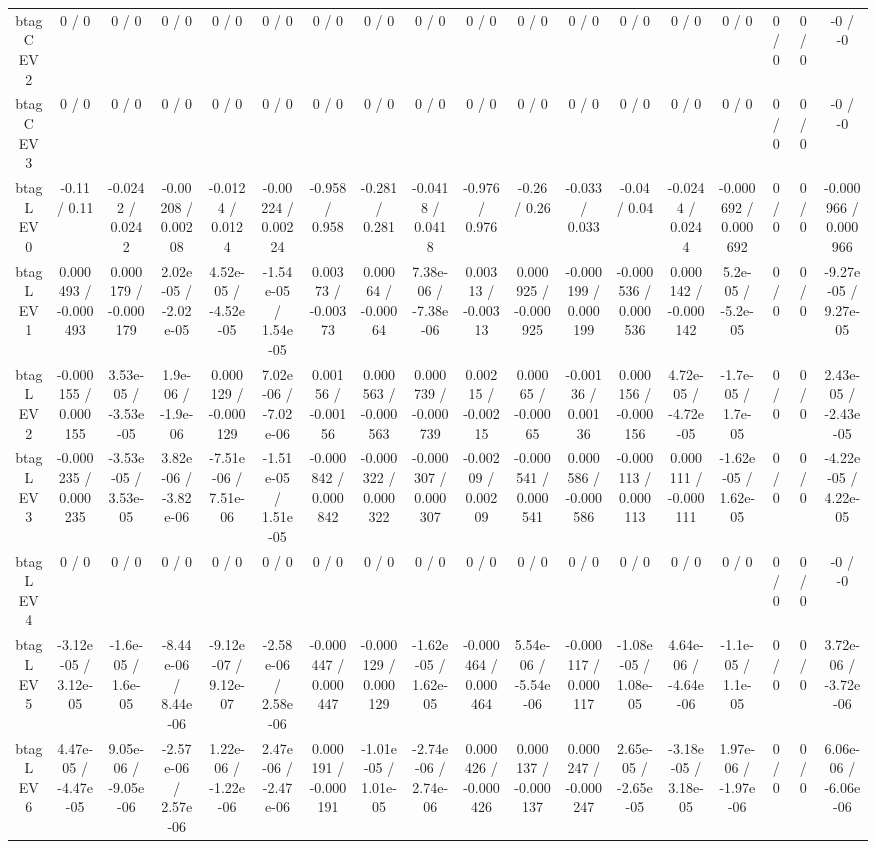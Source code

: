 \documentclass[10pt]{article}
\begin{document}
\begin{table}[htbp]
\begin{center}
\begin{tabular}{|c|c|c|c|c|c|c|c|c|c|c|c|c|c|c|c|c|c|}
  btag C EV 2 & 0 / 0 & 0 / 0 & 0 / 0 & 0 / 0 & 0 / 0 & 0 / 0 & 0 / 0 & 0 / 0 & 0 / 0 & 0 / 0 & 0 / 0 & 0 / 0 & 0 / 0 & 0 / 0 & 0 / 0 & 0 / 0 & -0 / -0 \\ 
  btag C EV 3 & 0 / 0 & 0 / 0 & 0 / 0 & 0 / 0 & 0 / 0 & 0 / 0 & 0 / 0 & 0 / 0 & 0 / 0 & 0 / 0 & 0 / 0 & 0 / 0 & 0 / 0 & 0 / 0 & 0 / 0 & 0 / 0 & -0 / -0 \\ 
  btag L EV 0 & -0.11 / 0.11 & -0.0242 / 0.0242 & -0.00208 / 0.00208 & -0.0124 / 0.0124 & -0.00224 / 0.00224 & -0.958 / 0.958 & -0.281 / 0.281 & -0.0418 / 0.0418 & -0.976 / 0.976 & -0.26 / 0.26 & -0.033 / 0.033 & -0.04 / 0.04 & -0.0244 / 0.0244 & -0.000692 / 0.000692 & 0 / 0 & 0 / 0 & -0.000966 / 0.000966 \\ 
  btag L EV 1 & 0.000493 / -0.000493 & 0.000179 / -0.000179 & 2.02e-05 / -2.02e-05 & 4.52e-05 / -4.52e-05 & -1.54e-05 / 1.54e-05 & 0.00373 / -0.00373 & 0.00064 / -0.00064 & 7.38e-06 / -7.38e-06 & 0.00313 / -0.00313 & 0.000925 / -0.000925 & -0.000199 / 0.000199 & -0.000536 / 0.000536 & 0.000142 / -0.000142 & 5.2e-05 / -5.2e-05 & 0 / 0 & 0 / 0 & -9.27e-05 / 9.27e-05 \\ 
  btag L EV 2 & -0.000155 / 0.000155 & 3.53e-05 / -3.53e-05 & 1.9e-06 / -1.9e-06 & 0.000129 / -0.000129 & 7.02e-06 / -7.02e-06 & 0.00156 / -0.00156 & 0.000563 / -0.000563 & 0.000739 / -0.000739 & 0.00215 / -0.00215 & 0.00065 / -0.00065 & -0.00136 / 0.00136 & 0.000156 / -0.000156 & 4.72e-05 / -4.72e-05 & -1.7e-05 / 1.7e-05 & 0 / 0 & 0 / 0 & 2.43e-05 / -2.43e-05 \\ 
  btag L EV 3 & -0.000235 / 0.000235 & -3.53e-05 / 3.53e-05 & 3.82e-06 / -3.82e-06 & -7.51e-06 / 7.51e-06 & -1.51e-05 / 1.51e-05 & -0.000842 / 0.000842 & -0.000322 / 0.000322 & -0.000307 / 0.000307 & -0.00209 / 0.00209 & -0.000541 / 0.000541 & 0.000586 / -0.000586 & -0.000113 / 0.000113 & 0.000111 / -0.000111 & -1.62e-05 / 1.62e-05 & 0 / 0 & 0 / 0 & -4.22e-05 / 4.22e-05 \\ 
  btag L EV 4 & 0 / 0 & 0 / 0 & 0 / 0 & 0 / 0 & 0 / 0 & 0 / 0 & 0 / 0 & 0 / 0 & 0 / 0 & 0 / 0 & 0 / 0 & 0 / 0 & 0 / 0 & 0 / 0 & 0 / 0 & 0 / 0 & -0 / -0 \\ 
  btag L EV 5 & -3.12e-05 / 3.12e-05 & -1.6e-05 / 1.6e-05 & -8.44e-06 / 8.44e-06 & -9.12e-07 / 9.12e-07 & -2.58e-06 / 2.58e-06 & -0.000447 / 0.000447 & -0.000129 / 0.000129 & -1.62e-05 / 1.62e-05 & -0.000464 / 0.000464 & 5.54e-06 / -5.54e-06 & -0.000117 / 0.000117 & -1.08e-05 / 1.08e-05 & 4.64e-06 / -4.64e-06 & -1.1e-05 / 1.1e-05 & 0 / 0 & 0 / 0 & 3.72e-06 / -3.72e-06 \\ 
  btag L EV 6 & 4.47e-05 / -4.47e-05 & 9.05e-06 / -9.05e-06 & -2.57e-06 / 2.57e-06 & 1.22e-06 / -1.22e-06 & 2.47e-06 / -2.47e-06 & 0.000191 / -0.000191 & -1.01e-05 / 1.01e-05 & -2.74e-06 / 2.74e-06 & 0.000426 / -0.000426 & 0.000137 / -0.000137 & 0.000247 / -0.000247 & 2.65e-05 / -2.65e-05 & -3.18e-05 / 3.18e-05 & 1.97e-06 / -1.97e-06 & 0 / 0 & 0 / 0 & 6.06e-06 / -6.06e-06 \\ 

\end{tabular}
\end{center}
\end{table}
\end{document}
